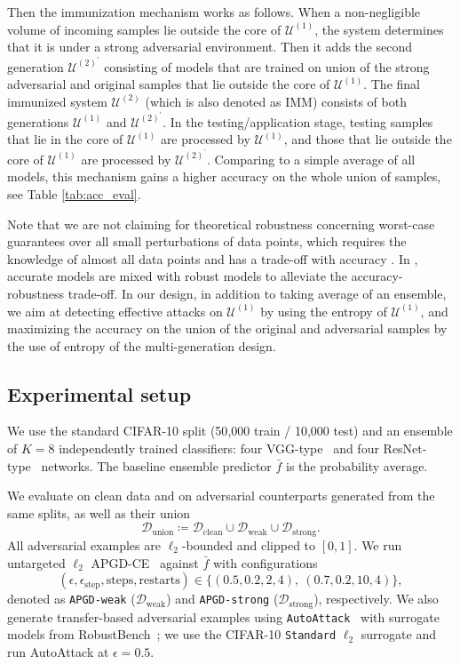 \documentclass{article}
\theoremstyle{plain}
\theoremstyle{definition}
\theoremstyle{remark}
\newcommand{\cU}{\mathcal{U}}
\newcommand{\cD}{\mathcal{D}}
\begin{document}
Then the immunization mechanism works as follows. When a non-negligible volume of incoming samples lie outside the core of  $\cU^{(1)}$, the system determines that it is under a strong adversarial environment. Then it adds the second generation $\cU^{(2)^\prime}$ consisting of models that are trained on union of the strong adversarial and original samples that lie outside the core of $\cU^{(1)}$. The final immunized system $\cU^{(2)}$ (which is also denoted as IMM) consists of both generations $\cU^{(1)}$ and $\cU^{(2)^\prime}$. In the testing/application stage, testing samples that lie in the core of $\cU^{(1)}$ are processed by $\cU^{(1)}$, and those that lie outside the core of $\cU^{(1)}$ are processed by $\cU^{(2)^\prime}$. Comparing to a simple average of all models, this mechanism gains a higher accuracy on the whole union of samples, see Table \ref{tab:acc_eval}.

Note that we are not claiming for theoretical robustness concerning worst-case guarantees over all small perturbations of data points, which requires the knowledge of almost all data points and has a trade-off with accuracy \cite{robustness_accuracy, trade_off_robustness}. In \cite{mixing_classifiers}, accurate models are mixed with robust models to  alleviate the accuracy-robustness trade-off. In our design, in addition to taking average of an ensemble, we aim at detecting effective attacks on $\cU^{(1)}$ by using the entropy of $\cU^{(1)}$, and maximizing the accuracy on the union of the original and adversarial samples by the use of entropy of the multi-generation design.


\subsection{Experimental setup}
\label{subsec:exp_setup}

We use the standard CIFAR-10 split (50{,}000 train / 10{,}000 test) and an ensemble of $K=8$ independently trained classifiers: four VGG-type~\cite{VGG} and four ResNet-type~\cite{ResNet} networks.
The baseline ensemble predictor $\bar{f}$ is the probability average.

We evaluate on clean data and on adversarial counterparts generated from the same splits, as well as their union
\[
\mathcal{D}_{\mathrm{union}} \coloneqq 
\mathcal{D}_{\mathrm{clean}} \cup \mathcal{D}_{\mathrm{weak}} \cup \mathcal{D}_{\mathrm{strong}}.
\]
All adversarial examples are $\ell_2$-bounded and clipped to $[0,1]$. 
We run untargeted $\ell_2$ APGD-CE~\cite{APGD} against $\bar f$ with configurations
\[
(\epsilon,\epsilon_{\text{step}},\text{steps},\text{restarts})
\in \{(0.5,0.2,2,4),\ (0.7,0.2,10,4)\},
\]
denoted as \texttt{APGD-weak} ($\cD_{\mathrm{weak}}$) and \texttt{APGD-strong} ($\cD_{\mathrm{strong}}$), respectively.
We also generate transfer-based adversarial examples using \texttt{AutoAttack}~\cite{auto_attack} with surrogate models from RobustBench~\cite{RobustBench}; we use the CIFAR-10 \texttt{Standard} $\ell_2$ surrogate and run AutoAttack at $\epsilon=0.5$.
\end{document}
